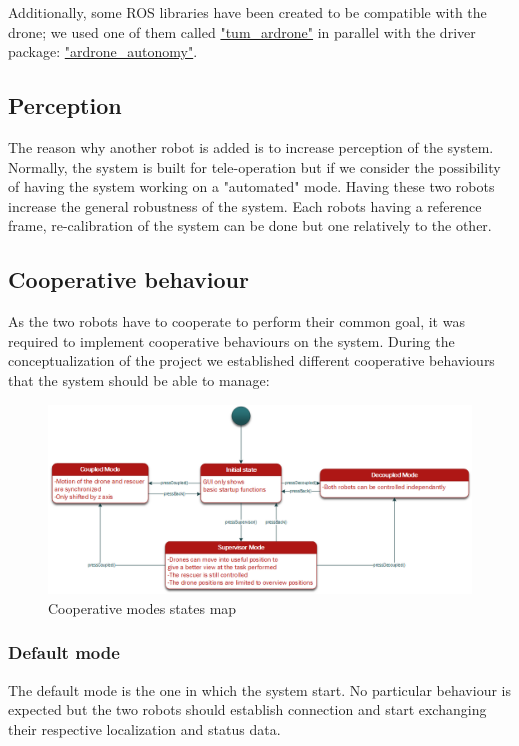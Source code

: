 \documentclass[11pt,a4paper,twocolumn]{article}
\begin{document}
Additionally, some ROS libraries have been created to be compatible with the drone; we used
one of them called \href{"http://wiki.ros.org/tum_ardrone"}{"tum\_ardrone"} in parallel with
the driver package: \href{"https://github.com/AutonomyLab/ardrone_autonomy"}
{"ardrone\_autonomy"}.

\subsection{Perception}
The reason why another robot is added is to increase perception of the system.
Normally, the system is built for tele-operation but if we consider the possibility of having the system
working on a "automated" mode. Having these two robots increase the general robustness of the system.
Each robots having a reference frame, re-calibration of the system can be done but one relatively to the
other.

\subsection{Cooperative behaviour}
As the two robots have to cooperate to perform their common goal, it was required to implement
cooperative behaviours on the system. During the conceptualization of the project we established different
cooperative behaviours that the system should be able to manage:

\begin{figure}[h]	
\includegraphics[width=\textwidth]{cooperativeModes.png}
\caption{Cooperative modes states map}
\end{figure}

\subsubsection{Default mode}
The default mode is the one in which the system start. No particular behaviour is expected but the two
robots should establish connection and start exchanging their respective localization and status data.
\end{document}
